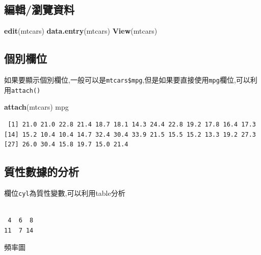\documentclass[]{book}
\newenvironment{Shaded}{\begin{snugshade}}{\end{snugshade}}
\newcommand{\KeywordTok}[1]{\textcolor[rgb]{0.13,0.29,0.53}{\textbf{#1}}}
\newcommand{\NormalTok}[1]{#1}
\newcommand{\OperatorTok}[1]{\textcolor[rgb]{0.81,0.36,0.00}{\textbf{#1}}}
\theoremstyle{definition}
\theoremstyle{definition}
\theoremstyle{definition}
\theoremstyle{remark}
\begin{document}
\subsection{編輯/瀏覽資料}

\begin{Shaded}
\begin{Highlighting}[]
\KeywordTok{edit}\NormalTok{(mtcars)}
\KeywordTok{data.entry}\NormalTok{(mtcars)}
\KeywordTok{View}\NormalTok{(mtcars)}
\end{Highlighting}
\end{Shaded}

\subsection{個別欄位}

如果要顯示個別欄位,一般可以是\texttt{mtcars\$mpg},但是如果要直接使用\texttt{mpg}欄位,可以利用\texttt{attach()}

\begin{Shaded}
\begin{Highlighting}[]
\KeywordTok{attach}\NormalTok{(mtcars)}
\NormalTok{mpg}
\end{Highlighting}
\end{Shaded}

\begin{verbatim}
 [1] 21.0 21.0 22.8 21.4 18.7 18.1 14.3 24.4 22.8 19.2 17.8 16.4 17.3
[14] 15.2 10.4 10.4 14.7 32.4 30.4 33.9 21.5 15.5 15.2 13.3 19.2 27.3
[27] 26.0 30.4 15.8 19.7 15.0 21.4
\end{verbatim}

\subsection{質性數據的分析}

欄位\texttt{cyl}為質性變數,可以利用table分析

\begin{Shaded}
\end{Shaded}

\begin{verbatim}

 4  6  8 
11  7 14 
\end{verbatim}

頻率圖

\begin{Shaded}
\end{Shaded}
\end{document}
